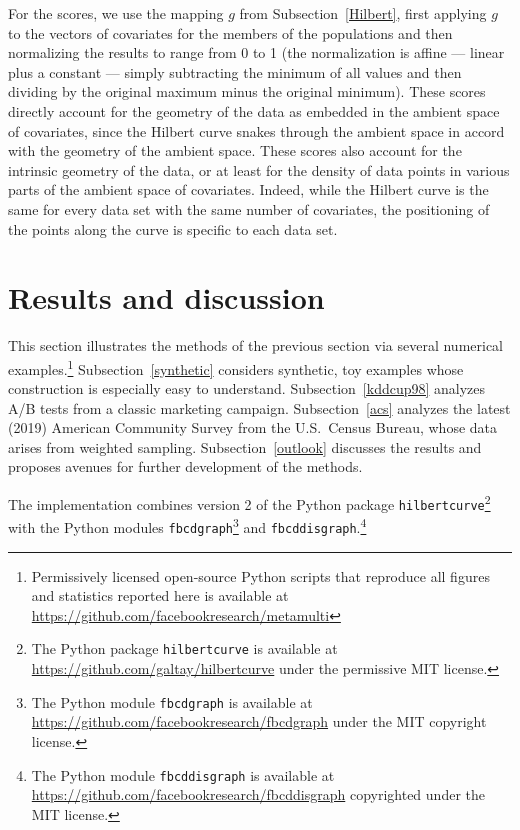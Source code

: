 \documentclass{article}
\begin{document}
For the scores, we use the mapping $g$ from Subsection~\ref{Hilbert},
first applying $g$ to the vectors of covariates
for the members of the populations and then normalizing the results
to range from 0 to 1 (the normalization is affine --- linear plus a constant
--- simply subtracting the minimum of all values
and then dividing by the original maximum minus the original minimum).
These scores directly account for the geometry of the data
as embedded in the ambient space of covariates, since the Hilbert curve snakes
through the ambient space in accord with the geometry of the ambient space.
These scores also account for the intrinsic geometry of the data, or
at least for the density of data points in various parts of the ambient space
of covariates. Indeed, while the Hilbert curve is the same for every data set
with the same number of covariates, the positioning of the points
along the curve is specific to each data set.



\section{Results and discussion}
\label{results}

This section illustrates the methods of the previous section
via several numerical examples.\footnote{Permissively licensed
open-source Python scripts that reproduce all figures and statistics
reported here is available at
\url{https://github.com/facebookresearch/metamulti}}
Subsection~\ref{synthetic} considers synthetic, toy examples
whose construction is especially easy to understand.
Subsection~\ref{kddcup98} analyzes A/B tests from a classic marketing campaign.
Subsection~\ref{acs} analyzes the latest (2019) American Community Survey
from the U.S.\ Census Bureau, whose data arises from weighted sampling.
Subsection~\ref{outlook} discusses the results and proposes avenues
for further development of the methods.

The implementation combines version 2 of the Python package
{\tt hilbertcurve}\footnote{The Python package {\tt hilbertcurve}
is available at \url{https://github.com/galtay/hilbertcurve}
under the permissive MIT license.} with the Python modules
{\tt fbcdgraph}\footnote{The Python module {\tt fbcdgraph}
is available at \url{https://github.com/facebookresearch/fbcdgraph}
under the MIT copyright license.} and
{\tt fbcddisgraph}.\footnote{The Python module {\tt fbcddisgraph}
is available at \url{https://github.com/facebookresearch/fbcddisgraph}
copyrighted under the MIT license.}
\end{document}
